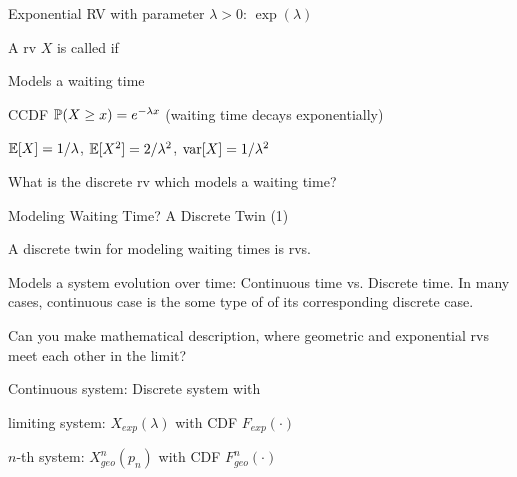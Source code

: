 \documentclass[fleqn,aspectratio=169]{beamer}
\begin{document}
\begin{frame}{Exponential RV with parameter $\lambda >0$: $\exp(\lambda)$}

\plitemsep 0.02in
\bci 
\item<2-> A rv $X$ is called  if
\item<3-> Models a waiting time
\item<4-> CCDF $\mathbb{P}( X \ge x ) = e^{-\lambda x}$ (waiting time decays exponentially)
\item<5-> $\mathbb{E}[ X ] = 1/\lambda$, $\mathbb{E}[ X^2 ] = 2/\lambda^2$, $\text{var}[ X ] = 1/\lambda^2$
\item<6->  What is the discrete rv which models a waiting time?  
\eci 

\vspace{-0.5cm}
\raggedleft
{}

\end{frame}

\begin{frame}{Modeling Waiting Time? A Discrete Twin (1)}

\plitemsep 0.05in
\bci 
\item<2-> A discrete twin for modeling waiting times is  rvs. 

\item<3-> Models a system evolution over time: Continuous time vs. Discrete time. In many cases, continuous case is the some type of  of its corresponding discrete case.  

\item<4-> Can you make mathematical description, where geometric and exponential rvs meet each other in the limit? 

\item<5-> 
\bci
\item Continuous system: Discrete system with  

\eci

\item<7-> limiting system: $X_{exp}(\lambda)$ with CDF $F_{exp}(\cdot)$

\item<8-> $n$-th system: $X^n_{geo}(p_n)$  with CDF $F^n_{geo}(\cdot)$

\eci 
\end{frame}
\end{document}
